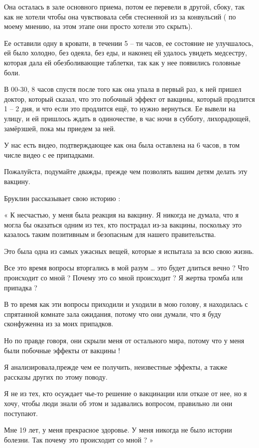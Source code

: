 Она осталась в зале основного приема, потом ее перевели в другой, сбоку, так как
не хотели чтобы она чувствовала себя стесненной из за конвульсий ( по моему
мнению, на этом этапе они просто хотели это скрыть).

Ее оставили одну в кровати, в течении 5 – ти часов, ее состояние не улучшалось,
ей было холодно, без одеяла, без еды, и наконец ей удалось увидеть медсестру,
которая дала ей обезболивающие таблетки, так как у нее появились головные боли.

В 00-30, 8 часов спустя после того как она упала в первый раз, к ней пришел
доктор, который сказал, что это побочный эффект от вакцины, который продлится 1
– 2 дня, и что если это продлится ещё, то нужно вернуться. Ее вывели на улицу, и
ей пришлось ждать в одиночестве, в час ночи в субботу, лихорадющей, замёрзшей,
пока мы приедем за ней.

У нас есть видео, подтверждающее как она была оставлена на 6 часов, в том числе
видео с ее припадками.

Пожалуйста, подумайте дважды, прежде чем позволять вашим детям делать эту
вакцину.

Бруклин рассказывает свою историю :

« К несчастью, у меня была реакция на вакцину. Я никогда не думала, что я могла
бы оказаться одним из тех, кто пострадал из-за вакцины, поскольку это казалось
таким позитивным и безопасным для нашего правительства.

Это была одна из самых ужасных вещей, которые я испытала за всю свою жизнь.

Все это время вопросы вторгались в мой разум … это будет длиться вечно ? Что
происходит со мной ? Почему это со мной происходит ? Я жертва тромба или
припадка ?

В то время как эти вопросы приходили и уходили в мою голову, я находилась с
спрятанной комнате зала ожидания, потому что они думали, что я буду сконфуженна
из за моих припадков.

Но по правде говоря, они скрыли меня от остального мира, потому что у меня были
побочные эффекты от вакцины !

Я анализировала,прежде чем ее получить, неизвестные эффекты, а также рассказы
других по этому поводу.

Я не из тех, кто осуждает чье-то решение о вакцинации или отказе от нее, но я
хочу, чтобы люди знали об этом и задавались вопросом, правильно ли они
поступают.

Мне 19 лет, у меня прекрасное здоровье. У меня никогда не было истории
болезни. Так почему это происходит со мной ? »

